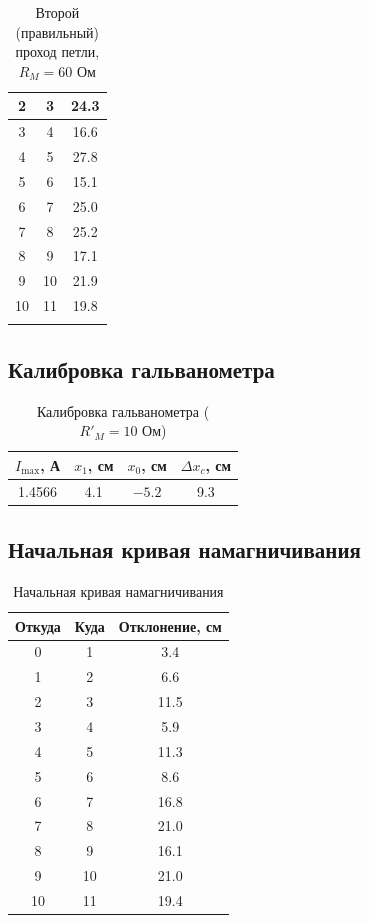 \documentclass[a4paper]{article}
\begin{document}
\begin{longtable}{|c|c|c|}
	2 & 3 & 24.3 \\ \hline
	3 & 4 & 16.6 \\ \hline
	4 & 5 & 27.8 \\ \hline
	5 & 6 & 15.1 \\ \hline
	6 & 7 & 25.0 \\ \hline
	7 & 8 & 25.2 \\ \hline
	8 & 9 & 17.1 \\ \hline
	9 & 10 & 21.9 \\ \hline
	10 & 11 & 19.8 \\ \hline
	\caption{Второй (правильный) проход петли, $R_M = 60$ Ом}
	\label{tab:second_attempt}
\end{longtable}

\subsection{Калибровка гальванометра}

\begin{table}[h]
	\centering
	\caption{Калибровка гальванометра ($R'_M = 10$ Ом)}
	\label{tab:calib}
	\begin{tabular}{|c|c|c|c|}
		\hline
		$I_{\max}$, А & $x_1$, см & $x_0$, см & $\Delta x_c$, см \\
		\hline
		1.4566 & 4.1 & $-5.2$ & 9.3 \\
		\hline
	\end{tabular}
\end{table}

\subsection{Начальная кривая намагничивания}

\begin{table}[h]
	\centering
	\caption{Начальная кривая намагничивания}
	\label{tab:initial}
	\begin{tabular}{|c|c|c|}
		\hline
		Откуда & Куда & Отклонение, см \\
		\hline
		0 & 1 & 3.4 \\ \hline
		1 & 2 & 6.6 \\ \hline
		2 & 3 & 11.5 \\ \hline
		3 & 4 & 5.9 \\ \hline
		4 & 5 & 11.3 \\ \hline
		5 & 6 & 8.6 \\ \hline
		6 & 7 & 16.8 \\ \hline
		7 & 8 & 21.0 \\ \hline
		8 & 9 & 16.1 \\ \hline
		9 & 10 & 21.0 \\ \hline
		10 & 11 & 19.4 \\ \hline
	\end{tabular}
\end{table}
\end{document}
